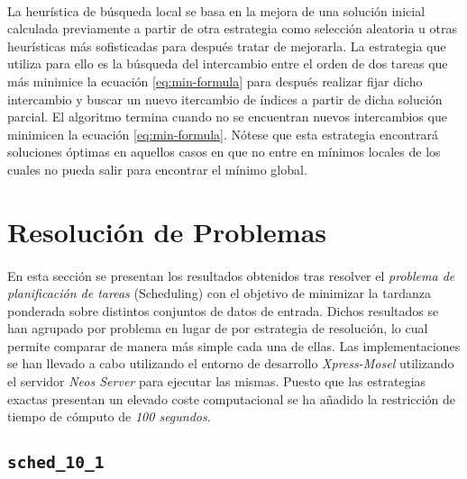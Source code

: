 \documentclass[spanish]{article}
\begin{document}
			\paragraph{}
			La heurística de búsqueda local se basa en la mejora de una solución inicial calculada previamente a partir de otra estrategia como selección aleatoria u otras heurísticas más sofisticadas para después tratar de mejorarla. La estrategia que utiliza para ello es la búsqueda del intercambio entre el orden de dos tareas que más minimice la ecuación \eqref{eq:min-formula} para después realizar fijar dicho intercambio y buscar un nuevo itercambio de índices a partir de dicha solución parcial. El algoritmo termina cuando no se encuentran nuevos intercambios que minimicen la ecuación \eqref{eq:min-formula}. Nótese que esta estrategia encontrará soluciones óptimas en aquellos casos en que no entre en mínimos locales de los cuales no pueda salir para encontrar el mínimo global.


	\section{Resolución de Problemas}
	\label{sec:problems}

		\paragraph{}
		En esta sección se presentan los resultados obtenidos tras resolver el \emph{problema de planificación de tareas} (Scheduling) con el objetivo de minimizar la tardanza ponderada sobre distintos conjuntos de datos de entrada. Dichos resultados se han agrupado por problema en lugar de por estrategia de resolución, lo cual permite comparar de manera más simple cada una de ellas. Las implementaciones se han llevado a cabo utilizando el entorno de desarrollo \emph{Xpress-Mosel} \cite{tool:xpress-mosel} utilizando el servidor \emph{Neos Server} \cite{tool:neos-server} para ejecutar las mismas. Puesto que las estrategias exactas presentan un elevado coste computacional se ha añadido la restricción de tiempo de cómputo de \emph{100 segundos}.

		\subsection{\texttt{sched\_10\_1}}
\end{document}
